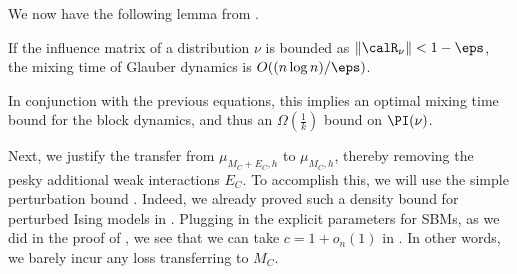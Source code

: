 \documentclass[11pt,letterpaper]{article}
\begin{document}
We now have the following lemma from \cite{Hay06}.

\begin{lemma}
    If the influence matrix of a distribution $\nu$ is bounded as $\|\calR_{\nu}\| < 1-\eps$, the mixing time of Glauber dynamics is $O((n \log n)/\eps)$.
\end{lemma}

In conjunction with the previous equations, this implies an optimal mixing time bound for the block dynamics, and thus an $\Omega\left(\frac{1}{k}\right)$ bound on $\PI(\nu)$.

Next, we justify the transfer from $\mu_{M_C+E_C, h}$ to $\mu_{M_C, h}$, thereby removing the pesky additional weak interactions $E_C$. 
To accomplish this, we will use the simple perturbation bound .
Indeed, we already proved such a density bound for perturbed Ising models in .
Plugging in the explicit parameters for SBMs, as we did in the proof of , we see that we can take $c = 1 + o_n(1)$ in .
In other words, we barely incur any loss transferring to $M_C$. 
\end{document}

